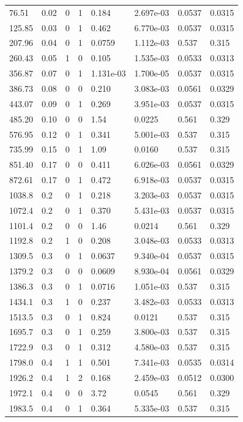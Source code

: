 \documentclass[preview]{standalone}
\begin{document}
{{\begin{tabular}{L{1.2cm}C{1.2cm} C{0.3cm}C{0.5cm} C{1.4cm}C{1.4cm} C{1.4cm}C{1.4cm}}
  76.51  &  0.02  & 0     &  1 &  0.184  & 2.697e-03  & 0.0537 &  0.0315   \\ 
  125.85  &  0.03  & 0     &  1 &  0.462  & 6.770e-03  & 0.0537 &  0.0315   \\ 
  207.96  &  0.04  & 0     &  1 &  0.0759  & 1.112e-03  & 0.537 &  0.315   \\ 
  260.43  &  0.05  & 1     &  0 &  0.105  & 1.535e-03  & 0.0533 &  0.0313   \\ 
  356.87  &  0.07  & 0     &  1 &  1.131e-03  & 1.700e-05  & 0.0537 &  0.0315   \\ 
  386.73  &  0.08  & 0     &  0 &  0.210  & 3.083e-03  & 0.0561 &  0.0329   \\ 
  443.07  &  0.09  & 0     &  1 &  0.269  & 3.951e-03  & 0.0537 &  0.0315   \\ 
  485.20  &  0.10  & 0     &  0 &  1.54  & 0.0225  & 0.561 &  0.329   \\ 
  576.95  &  0.12  & 0     &  1 &  0.341  & 5.001e-03  & 0.537 &  0.315   \\ 
  735.99  &  0.15  & 0     &  1 &  1.09  & 0.0160  & 0.537 &  0.315   \\ 
  851.40  &  0.17  & 0     &  0 &  0.411  & 6.026e-03  & 0.0561 &  0.0329   \\ 
  872.61  &  0.17  & 0     &  1 &  0.472  & 6.918e-03  & 0.0537 &  0.0315   \\ 
  1038.8  &   0.2  & 0     &  1 &  0.218  & 3.203e-03  & 0.0537 &  0.0315   \\ 
  1072.4  &   0.2  & 0     &  1 &  0.370  & 5.431e-03  & 0.0537 &  0.0315   \\ 
  1101.4  &   0.2  & 0     &  0 &  1.46  & 0.0214  & 0.561 &  0.329   \\ 
  1192.8  &   0.2  & 1     &  0 &  0.208  & 3.048e-03  & 0.0533 &  0.0313   \\ 
  1309.5  &   0.3  & 0     &  1 &  0.0637  & 9.340e-04  & 0.0537 &  0.0315   \\ 
  1379.2  &   0.3  & 0     &  0 &  0.0609  & 8.930e-04  & 0.0561 &  0.0329   \\ 
  1386.3  &   0.3  & 0     &  1 &  0.0716  & 1.051e-03  & 0.537 &  0.315   \\ 
  1434.1  &   0.3  & 1     &  0 &  0.237  & 3.482e-03  & 0.0533 &  0.0313   \\ 
  1513.5  &   0.3  & 0     &  1 &  0.824  & 0.0121  & 0.537 &  0.315   \\ 
  1695.7  &   0.3  & 0     &  1 &  0.259  & 3.800e-03  & 0.537 &  0.315   \\ 
  1722.9  &   0.3  & 0     &  1 &  0.312  & 4.580e-03  & 0.537 &  0.315   \\ 
  1798.0  &   0.4  & 1     &  1 &  0.501  & 7.341e-03  & 0.0535 &  0.0314   \\ 
  1926.2  &   0.4  & 1     &  2 &  0.168  & 2.459e-03  & 0.0512 &  0.0300   \\ 
  1972.1  &   0.4  & 0     &  0 &  3.72  & 0.0545  & 0.561 &  0.329   \\ 
  1983.5  &   0.4  & 0     &  1 &  0.364  & 5.335e-03  & 0.537 &  0.315   \\ 
\hline 
\end{tabular} 

}}
\end{document}
